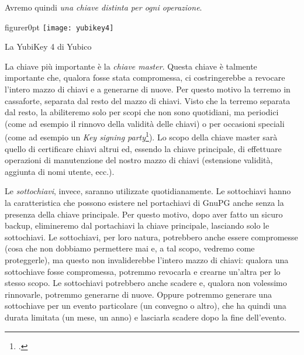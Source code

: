 Avremo quindi \emph{una chiave distinta per ogni operazione}.\bigskip

\begin{wrapfloat}{figure}{r}{0pt}
  \texttt{[image: yubikey4]}
  \caption{La YubiKey 4 di Yubico}
  \label{fig:yubikey4}
\end{wrapfloat}

La chiave più importante è la \emph{chiave master}. Questa chiave è
talmente importante che, qualora fosse stata compromessa, ci costringerebbe a
revocare l'intero mazzo di chiavi e a generarne di nuove. Per questo motivo la
terremo in cassaforte, separata dal resto del mazzo di chiavi. Visto che la
terremo separata dal resto, la abiliteremo solo per scopi che non sono
quotidiani, ma periodici (come ad esempio il rinnovo della validità delle
chiavi) o per occasioni speciali (come ad esempio un \emph{Key signing
party}\footnote{\cite{wiki:ksp}.}). Lo scopo della chiave master sarà quello di
certificare chiavi altrui ed, essendo la chiave principale, di effettuare
operazioni di manutenzione del nostro mazzo di chiavi (estensione validità,
aggiunta di nomi utente, ecc.).

Le \emph{sottochiavi}, invece, saranno utilizzate quotidianamente. Le
sottochiavi hanno la caratteristica che possono esistere nel portachiavi di
GnuPG anche senza la presenza della chiave principale. Per questo motivo, dopo
aver fatto un sicuro backup, elimineremo dal portachiavi la chiave principale,
lasciando solo le sottochiavi. Le sottochiavi, per loro natura, potrebbero anche
essere compromesse (cosa che non dobbiamo permettere mai e, a tal scopo, vedremo
come proteggerle), ma questo non invaliderebbe l'intero mazzo di chiavi: qualora
una sottochiave fosse compromessa, potremmo revocarla e crearne un'altra per lo
stesso scopo. Le sottochiavi potrebbero anche scadere e, qualora non volessimo
rinnovarle, potremmo generarne di nuove. Oppure potremmo generare una
sottochiave per un evento particolare (un convegno o altro), che ha quindi una
durata limitata (un mese, un anno) e lasciarla scadere dopo la fine
dell'evento.\bigskip

